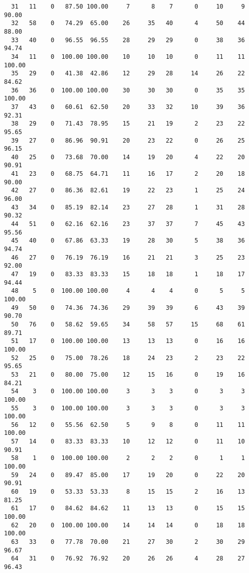 \begin{verbatim}
  31   11    0   87.50 100.00     7      8    7      0     10     9    90.00
  32   58    0   74.29  65.00    26     35   40      4     50    44    88.00
  33   40    0   96.55  96.55    28     29   29      0     38    36    94.74
  34   11    0  100.00 100.00    10     10   10      0     11    11   100.00
  35   29    0   41.38  42.86    12     29   28     14     26    22    84.62
  36   36    0  100.00 100.00    30     30   30      0     35    35   100.00
  37   43    0   60.61  62.50    20     33   32     10     39    36    92.31
  38   29    0   71.43  78.95    15     21   19      2     23    22    95.65
  39   27    0   86.96  90.91    20     23   22      0     26    25    96.15
  40   25    0   73.68  70.00    14     19   20      4     22    20    90.91
  41   23    0   68.75  64.71    11     16   17      2     20    18    90.00
  42   27    0   86.36  82.61    19     22   23      1     25    24    96.00
  43   34    0   85.19  82.14    23     27   28      1     31    28    90.32
  44   51    0   62.16  62.16    23     37   37      7     45    43    95.56
  45   40    0   67.86  63.33    19     28   30      5     38    36    94.74
  46   27    0   76.19  76.19    16     21   21      3     25    23    92.00
  47   19    0   83.33  83.33    15     18   18      1     18    17    94.44
  48    5    0  100.00 100.00     4      4    4      0      5     5   100.00
  49   50    0   74.36  74.36    29     39   39      6     43    39    90.70
  50   76    0   58.62  59.65    34     58   57     15     68    61    89.71
  51   17    0  100.00 100.00    13     13   13      0     16    16   100.00
  52   25    0   75.00  78.26    18     24   23      2     23    22    95.65
  53   21    0   80.00  75.00    12     15   16      0     19    16    84.21
  54    3    0  100.00 100.00     3      3    3      0      3     3   100.00
  55    3    0  100.00 100.00     3      3    3      0      3     3   100.00
  56   12    0   55.56  62.50     5      9    8      0     11    11   100.00
  57   14    0   83.33  83.33    10     12   12      0     11    10    90.91
  58    1    0  100.00 100.00     2      2    2      0      1     1   100.00
  59   24    0   89.47  85.00    17     19   20      0     22    20    90.91
  60   19    0   53.33  53.33     8     15   15      2     16    13    81.25
  61   17    0   84.62  84.62    11     13   13      0     15    15   100.00
  62   20    0  100.00 100.00    14     14   14      0     18    18   100.00
  63   33    0   77.78  70.00    21     27   30      2     30    29    96.67
  64   31    0   76.92  76.92    20     26   26      4     28    27    96.43

\end{verbatim}
